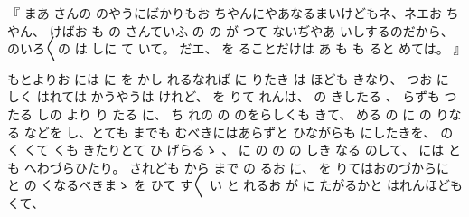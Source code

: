 
『
まあ
さんの
のやうにばかりもお
ちやんにやあなるまいけどもネ、ネエお
ちやん、
けばお
も
の
さんていふ
の
の
が
つて
ないぢやあ
いしするのだから、
のいろ〳〵の
は
しに
て
いて。
だエ、
を
ることだけは
あ
も
も
ると
めては。
』

もとよりお
には
に
を
かし
れるなれば
に
りたき
は
ほども
きなり、
つお
に
しく
はれては
かうやうは
けれど、
を
りて
れんは、
の
きしたる
、
らずも
つたる
しの
より
り
たる
に、
ち
れの
の
のをらしくも
きて、
める
の
に
の
りなる
などを
し、とても
までも
むべきにはあらずと
ひながらも
にしたきを、
の
く
くて
くも
きたりとて
ひ
げらるゝ
、
に
の
の
の
しき
なる
のして、
には
とも
へわづらひたり。
されども
から
まで
の
るお
に、
を
りてはおのづからに
と
の
くなるべきまゝ
を
ひて
す〳〵
い
と
れるお
が
に
たがるかと
はれんほども
くて、

